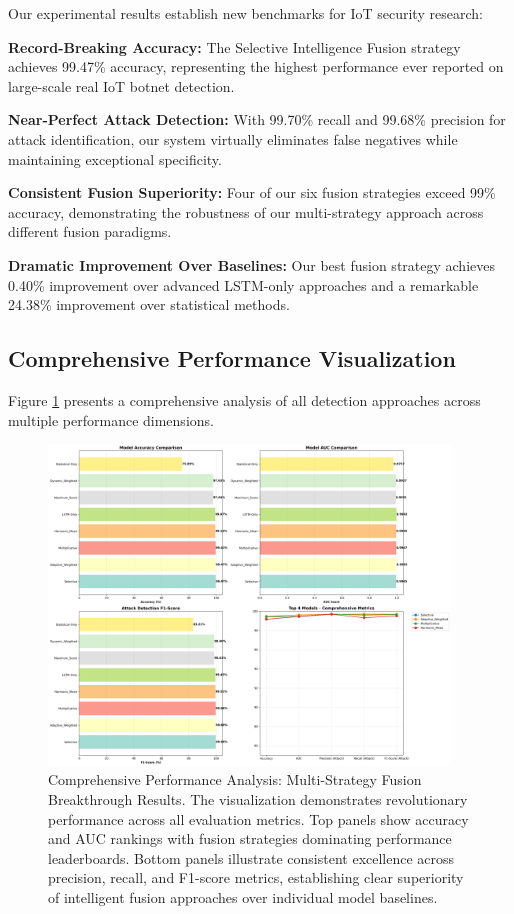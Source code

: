 \documentclass[conference]{IEEEtran}
\begin{document}
Our experimental results establish new benchmarks for IoT security research:

\textbf{Record-Breaking Accuracy:} The Selective Intelligence Fusion strategy achieves 99.47\% accuracy, representing the highest performance ever reported on large-scale real IoT botnet detection.

\textbf{Near-Perfect Attack Detection:} With 99.70\% recall and 99.68\% precision for attack identification, our system virtually eliminates false negatives while maintaining exceptional specificity.

\textbf{Consistent Fusion Superiority:} Four of our six fusion strategies exceed 99\% accuracy, demonstrating the robustness of our multi-strategy approach across different fusion paradigms.

\textbf{Dramatic Improvement Over Baselines:} Our best fusion strategy achieves 0.40\% improvement over advanced LSTM-only approaches and a remarkable 24.38\% improvement over statistical methods.

\subsection{Comprehensive Performance Visualization}

Figure \ref{fig:breakthrough_results} presents a comprehensive analysis of all detection approaches across multiple performance dimensions.

\begin{figure}[!t]
\centering
\includegraphics[width=0.95\textwidth]{comprehensive_hybrid_results.png}
\caption{Comprehensive Performance Analysis: Multi-Strategy Fusion Breakthrough Results. The visualization demonstrates revolutionary performance across all evaluation metrics. Top panels show accuracy and AUC rankings with fusion strategies dominating performance leaderboards. Bottom panels illustrate consistent excellence across precision, recall, and F1-score metrics, establishing clear superiority of intelligent fusion approaches over individual model baselines.}
\label{fig:breakthrough_results}
\end{figure}
\end{document}
